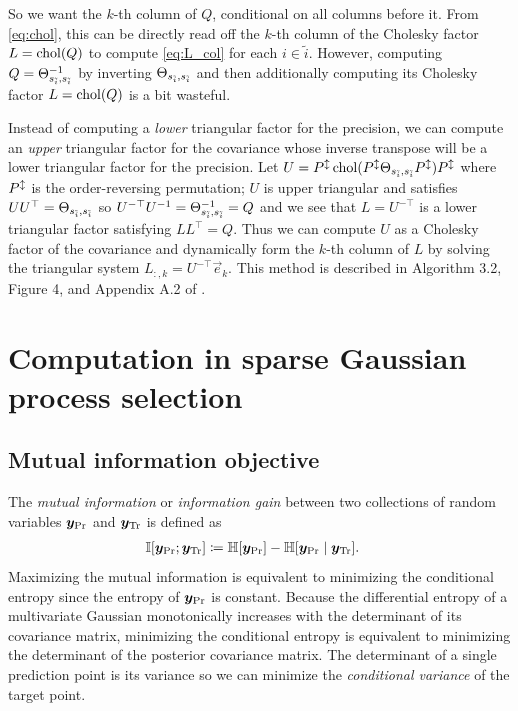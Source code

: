 \documentclass[review,supplement,onefignum,onetabnum]{siamonline220329}
\begin{document}
So we want the \( k \)-th column of \( Q
\), conditional on all columns before it.
From \cref{eq:chol}, this can be directly read off the \(
k \)-th column of the Cholesky factor \( L = \operatorname{chol}(Q) \)
to compute \cref{eq:L_col} for each \( i \in \tilde{i} \).
However, computing \( Q = \Theta_{s_{\tilde{i}}, s_{\tilde{i}}}^{-1} \) by
inverting \( \Theta_{s_{\tilde{i}}, s_{\tilde{i}}} \) and then additionally
computing its Cholesky factor \( L = \operatorname{chol}(Q) \) is a bit wasteful.

Instead of computing a \emph{lower} triangular factor for the precision,
we can compute an \emph{upper} triangular factor for the covariance whose
inverse transpose will be a lower triangular factor for the precision.
Let \( U = P^{\updownarrow} \operatorname{chol}(P^{\updownarrow} \Theta_{s_{\tilde{i}},
s_{\tilde{i}}} P^{\updownarrow}) P^{\updownarrow} \) where \( P^{\updownarrow} \) is the
order-reversing permutation; \( U \) is upper triangular and satisfies \( U
U^{\top} = \Theta_{s_{\tilde{i}}, s_{\tilde{i}}} \) so \( U^{-\top} U^{-1} =
\Theta_{s_{\tilde{i}}, s_{\tilde{i}}}^{-1} = Q \) and we see that \( L = U^{-\top}
\) is a lower triangular factor satisfying \( L L^{\top} = Q \).
Thus we can compute \( U \) as a Cholesky factor of the covariance
and dynamically form the \( k \)-th column of \( L \) by solving
the triangular system \( L_{:, k} = U^{-\top} \vec{e}_k \).
This method is described in Algorithm 3.2, Figure
4, and Appendix A.2 of \cite{schafer2021sparse}.

\newpage

\section{Computation in sparse Gaussian process selection}

\subsection{Mutual information objective}
\label{app:mutual_info}

The \emph{mutual information} or \emph{information
gain} between two collections of random variables \(
\bm{y}_{\text{Pr}} \) and \( \bm{y}_{\text{Tr}} \) is defined as
\begin{align}
  \label{eq:info}
  \MI[\vec{y}_\Pred;\vec{y}_\Train] &\defeq \entropy[\vec{y}_\Pred] -
    \entropy[\vec{y}_\Pred \mid \vec{y}_\Train].
\end{align}
Maximizing the mutual information is equivalent to minimizing the
conditional entropy since the entropy of \( \bm{y}_{\text{Pr}} \) is constant.
Because the differential entropy of a multivariate Gaussian monotonically
increases with the determinant of its covariance matrix, minimizing the
conditional entropy is equivalent to minimizing the determinant of the
posterior covariance matrix.
The determinant of a single prediction point is its variance so we
can minimize the \emph{conditional variance} of the target point.
\end{document}
